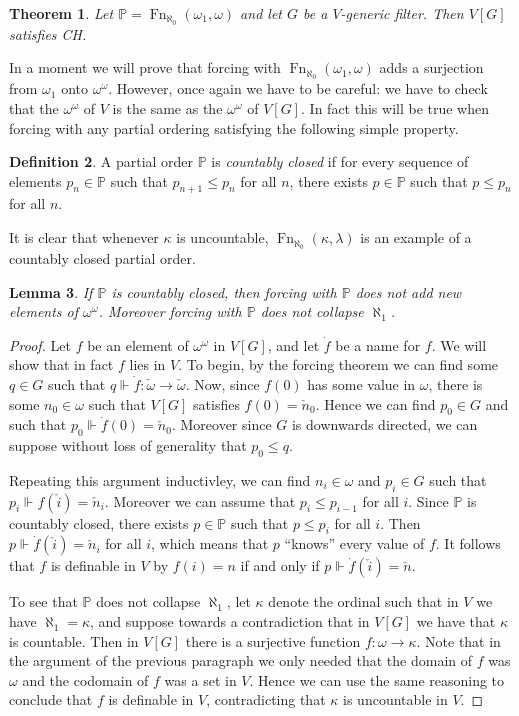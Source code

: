 \documentclass[11pt,oneside]{amsbook}
\newcommand{\PP}{\mathbb P}
\newcommand{\forces}{\Vdash}
\DeclareMathOperator{\Fn}{Fn}
\theoremstyle{definition}
\theoremstyle{plain}
\newtheorem{thm}{Theorem}[section]
\newtheorem{lem}[thm]{Lemma}
\theoremstyle{definition}
\newtheorem{defn}[thm]{Definition}
\theoremstyle{remark}
\numberwithin{equation}{section}
\numberwithin{figure}{section}
\begin{document}
\begin{thm}
  \label{thm:force-ch}
  Let $\PP=\Fn_{\aleph_0}(\omega_1,\omega)$ and let $G$ be a $V$-generic filter. Then $V[G]$ satisfies CH.
\end{thm}

In a moment we will prove that forcing with $\Fn_{\aleph_0}(\omega_1,\omega)$ adds a surjection from $\omega_1$ onto $\omega^\omega$. However, once again we have to be careful: we have to check that the $\omega^\omega$ of $V$ is the same as the $\omega^\omega$ of $V[G]$. In fact this will be true when forcing with any partial ordering satisfying the following simple property.

\begin{defn}
  A partial order $\PP$ is \emph{countably closed} if for every sequence of elements $p_n\in\PP$ such that $p_{n+1}\leq p_n$ for all $n$, there exists $p\in\PP$ such that $p\leq p_n$ for all $n$.
\end{defn}

It is clear that whenever $\kappa$ is uncountable, $\Fn_{\aleph_0}(\kappa,\lambda)$ is an example of a countably closed partial order.

\begin{lem}
  \label{lem:forcing-closed-preserves}
  If $\PP$ is countably closed, then forcing with $\PP$ does not add new elements of $\omega^\omega$. Moreover forcing with $\PP$ does not collapse $\aleph_1$.
\end{lem}

\begin{proof}
  Let $f$ be an element of $\omega^\omega$ in $V[G]$, and let $\dot f$ be a name for $f$. We will show that in fact $f$ lies in $V$. To begin, by the forcing theorem we can find some $q\in G$ such that $q\forces \dot f\colon\check\omega\to\check\omega$. Now, since $f(0)$ has some value in $\omega$, there is some $n_0\in\omega$ such that $V[G]$ satisfies $f(0)=\check n_0$. Hence we can find $p_0\in G$ and such that $p_0\forces\dot f(0)=\check n_0$. Moreover since $G$ is downwards directed, we can suppose without loss of generality that $p_0\leq q$.

  Repeating this argument inductivley, we can find $n_i\in\omega$ and $p_i\in G$ such that $p_i\forces f(\check i)=\check n_i$. Moreover we can assume that $p_i\leq p_{i-1}$ for all $i$. Since $\PP$ is countably closed, there exists $p\in\PP$ such that $p\leq p_i$ for all $i$. Then $p\forces\dot f(\check i)=\check n_i$ for all $i$, which means that $p$ ``knows'' every value of $f$. It follows that $f$ is definable in $V$ by $f(i)=n$ if and only if $p\forces\dot f(\check i)=\check n$.

  To see that $\PP$ does not collapse $\aleph_1$, let $\kappa$ denote the ordinal such that in $V$ we have $\aleph_1=\kappa$, and suppose towards a contradiction that in $V[G]$ we have that $\kappa$ is countable. Then in $V[G]$ there is a surjective function $f\colon\omega\to\kappa$. Note that in the argument of the previous paragraph we only needed that the domain of $f$ was $\omega$ and the codomain of $f$ was a set in $V$. Hence we can use the same reasoning to conclude that $f$ is definable in $V$, contradicting that $\kappa$ is uncountable in $V$.
\end{proof}
\end{document}

